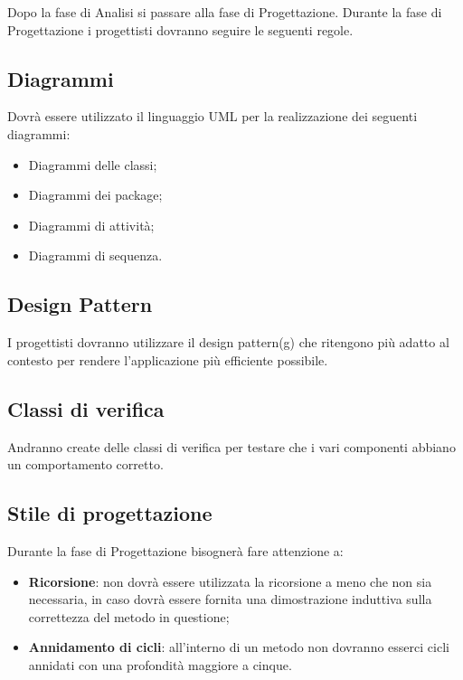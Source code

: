 Dopo la fase di Analisi si passare alla fase di Progettazione. Durante la fase di Progettazione i progettisti dovranno seguire le seguenti regole.\\

\subsection{Diagrammi}

Dovrà essere utilizzato il linguaggio UML per la realizzazione dei seguenti diagrammi:

\begin{itemize}
	\item Diagrammi delle classi;
	\item Diagrammi dei package;
	\item Diagrammi di attività;
	\item Diagrammi di sequenza.
\end{itemize}

\subsection{Design Pattern}

I progettisti dovranno utilizzare il design pattern(g) che ritengono più adatto al contesto per rendere l'applicazione più efficiente possibile.

\subsection{Classi di verifica}

Andranno create delle classi di verifica per testare che i vari componenti abbiano un comportamento corretto.

\subsection{Stile di progettazione}

Durante la fase di Progettazione bisognerà fare attenzione a:

\begin{itemize}
\item \textbf{Ricorsione}: non dovrà essere utilizzata la ricorsione a meno che non sia necessaria, in caso dovrà essere fornita una dimostrazione induttiva sulla correttezza del metodo in questione;
\item \textbf{Annidamento di cicli}: all'interno di un metodo non dovranno esserci cicli annidati con una profondità maggiore a cinque.
\end{itemize}